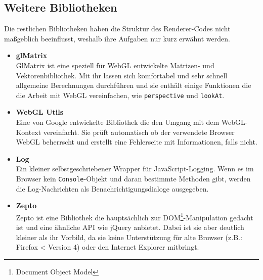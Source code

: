 \subsection{Weitere Bibliotheken}
Die restlichen Bibliotheken haben die Struktur des Renderer-Codes nicht maßgeblich beeinflusst, weshalb ihre Aufgaben nur kurz erwähnt werden.
\begin{itemize}
    \item \textbf{glMatrix}\\
GlMatrix ist eine speziell für WebGL entwickelte Matrizen- und Vektorenbibliothek. Mit ihr lassen sich komfortabel und sehr schnell allgemeine Berechnungen durchführen und sie enthält einige Funktionen die die Arbeit mit WebGL vereinfachen, wie \texttt{perspective} und \texttt{lookAt}.
    \item \textbf{WebGL Utils}\\
Eine von Google entwickelte Bibliothek die den Umgang mit dem WebGL-Kontext vereinfacht. Sie prüft automatisch ob der verwendete Browser WebGL beherrscht und erstellt eine Fehlerseite mit Informationen, falls nicht.
    \item \textbf{Log}\\
Ein kleiner selbstgeschriebener Wrapper für JavaScript-Logging. Wenn es im Browser kein \texttt{Console}-Objekt und daran bestimmte Methoden gibt, werden die Log-Nachrichten als Benachrichtigungsdialoge ausgegeben.
    \item \textbf{Zepto}\\
Zepto ist eine Bibliothek die hauptsächlich zur DOM\footnote{Document Object Model}-Manipulation gedacht ist und eine ähnliche API wie jQuery anbietet. Dabei ist sie aber deutlich kleiner als ihr Vorbild, da sie keine Unterstützung für alte Browser (z.B.: Firefox < Version 4) oder den Internet Explorer mitbringt.
\end{itemize}

